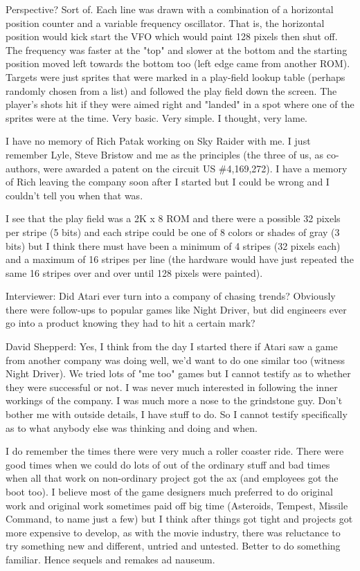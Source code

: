 Perspective? Sort of. Each line was drawn with a combination of a horizontal position counter and a variable frequency oscillator. That is, the horizontal position would kick start the VFO which would paint 128 pixels then shut off. The frequency was faster at the "top" and slower at the bottom and the starting position moved left towards the bottom too (left edge came from another ROM). Targets were just sprites that were marked in a play-field lookup table (perhaps randomly chosen from a list) and followed the play field down the screen. The player's shots hit if they were aimed right and "landed" in a spot where one of the sprites were at the time. Very basic. Very simple. I thought, very lame.

I have no memory of Rich Patak working on Sky Raider with me. I just remember Lyle, Steve Bristow and me as the principles (the three of us, as co-authors, were awarded a patent on the circuit US \#4,169,272). I have a memory of Rich leaving the company soon after I started but I could be wrong and I couldn't tell you when that was. 

I see that the play field was a 2K x 8 ROM and there were a possible 32 pixels per stripe (5 bits) and each stripe could be one of 8 colors or shades of gray (3 bits) but I think there must have been a minimum of 4 stripes (32 pixels each) and a maximum of 16 stripes per line (the hardware would have just repeated the same 16 stripes over and over until 128 pixels were painted).

\textcolor{interviewer}{Interviewer:} Did Atari ever turn into a company of chasing trends? Obviously there were follow-ups to popular games like Night Driver, but did engineers ever go into a product knowing they had to hit a certain mark?

\textcolor{interviewee}{David Shepperd:} Yes, I think from the day I started there if Atari saw a game from another company was doing well, we'd want to do one similar too (witness Night Driver). We tried lots of "me too" games but I cannot testify as to whether they were successful or not. I was never much interested in following the inner workings of the company. I was much more a nose to the grindstone guy. Don't bother me with outside details, I have stuff to do. So I cannot testify specifically as to what anybody else was thinking and doing and when. 

I do remember the times there were very much a roller coaster ride. There were good times when we could do lots of out of the ordinary stuff and bad times when all that work on non-ordinary project got the ax (and employees got the boot too). I believe most of the game designers much preferred to do original work and original work sometimes paid off big time (Asteroids, Tempest, Missile Command, to name just a few) but I think after things got tight and projects got more expensive to develop, as with the movie industry, there was reluctance to try something new and different, untried and untested. Better to do something familiar. Hence sequels and remakes ad nauseum.

